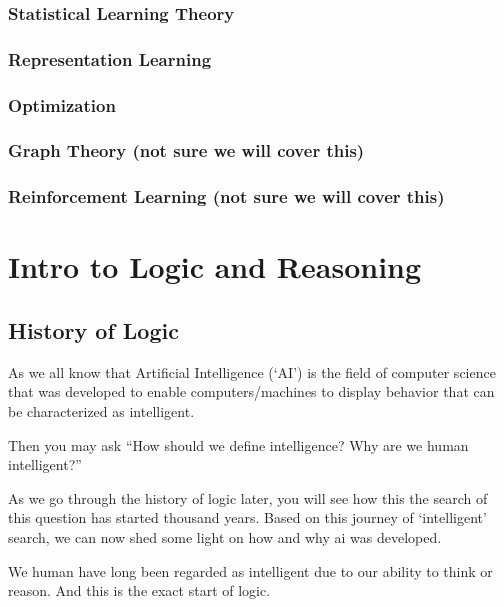 \documentclass[]{book}
\theoremstyle{definition}
\theoremstyle{definition}
\theoremstyle{definition}
\theoremstyle{remark}
\begin{document}
\subsection{Statistical Learning
Theory}\label{statistical-learning-theory}

\subsection{Representation Learning}\label{representation-learning}

\subsection{Optimization}\label{optimization}

\subsection{Graph Theory (not sure we will cover
this)}\label{graph-theory-not-sure-we-will-cover-this}

\subsection{Reinforcement Learning (not sure we will cover
this)}\label{reinforcement-learning-not-sure-we-will-cover-this}

\chapter{Intro to Logic and
Reasoning}\label{intro-to-logic-and-reasoning}

\section{History of Logic}\label{history-of-logic}

As we all know that Artificial Intelligence (`AI') is the field of
computer science that was developed to enable computers/machines to
display behavior that can be characterized as intelligent.

Then you may ask ``How should we define intelligence? Why are we human
intelligent?''

As we go through the history of logic later, you will see how this the
search of this question has started thousand years. Based on this
journey of `intelligent' search, we can now shed some light on how and
why ai was developed.

We human have long been regarded as intelligent due to our ability to
think or reason. And this is the exact start of logic.
\end{document}
